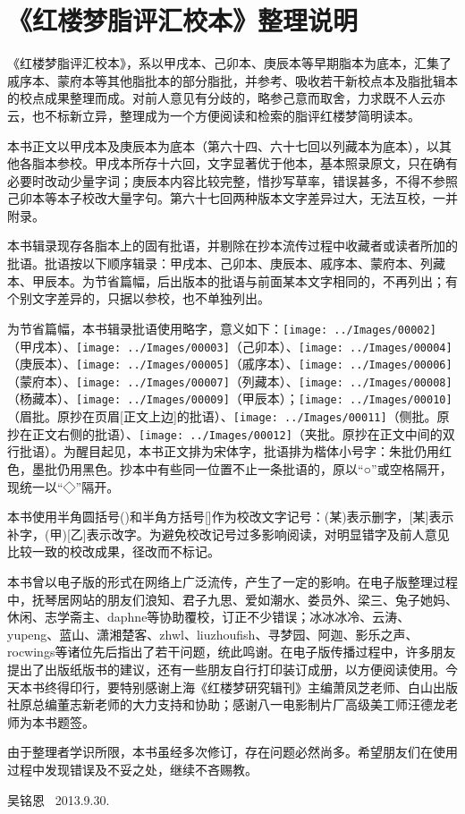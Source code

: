 
\chapter{《红楼梦脂评汇校本》整理说明}

《红楼梦脂评汇校本》，系以甲戌本、己卯本、庚辰本等早期脂本为底本，汇集了戚序本、蒙府本等其他脂批本的部分脂批，并参考、吸收若干新校点本及脂批辑本的校点成果整理而成。对前人意见有分歧的，略参己意而取舍，力求既不人云亦云，也不标新立异，整理成为一个方便阅读和检索的脂评红楼梦简明读本。

本书正文以甲戌本及庚辰本为底本（第六十四、六十七回以列藏本为底本），以其他各脂本参校。甲戌本所存十六回，文字显著优于他本，基本照录原文，只在确有必要时改动少量字词；庚辰本内容比较完整，惜抄写草率，错误甚多，不得不参照己卯本等本子校改大量字句。第六十七回两种版本文字差异过大，无法互校，一并附录。

本书辑录现存各脂本上的固有批语，并剔除在抄本流传过程中收藏者或读者所加的批语。批语按以下顺序辑录：甲戌本、己卯本、庚辰本、戚序本、蒙府本、列藏本、甲辰本。为节省篇幅，后出版本的批语与前面某本文字相同的，不再列出；有个别文字差异的，只据以参校，也不单独列出。

为节省篇幅，本书辑录批语使用略字，意义如下：\texttt{[image: ../Images/00002]}（甲戌本）、\texttt{[image: ../Images/00003]}（己卯本）、\texttt{[image: ../Images/00004]}（庚辰本）、\texttt{[image: ../Images/00005]}（戚序本）、\texttt{[image: ../Images/00006]}（蒙府本）、\texttt{[image: ../Images/00007]}（列藏本）、\texttt{[image: ../Images/00008]}（杨藏本）、\texttt{[image: ../Images/00009]}（甲辰本）；\texttt{[image: ../Images/00010]}\footnotesize  （眉批。原抄在页眉{[}正文上边{]}的批语）、\texttt{[image: ../Images/00011]}\footnotesize （侧批。原抄在正文右侧的批语）、\texttt{[image: ../Images/00012]}\footnotesize （夹批。原抄在正文中间的双行批语）。为醒目起见，本书正文排为宋体字，批语排为楷体小号字：朱批仍用红色，墨批仍用黑色。抄本中有些同一位置不止一条批语的，原以``○''或空格隔开，现统一以``◇''隔开。

本书使用半角圆括号()和半角方括号{[}{]}作为校改文字记号：(某)表示删字，{[}某{]}表示补字，(甲){[}乙{]}表示改字。为避免校改记号过多影响阅读，对明显错字及前人意见比较一致的校改成果，径改而不标记。

本书曾以电子版的形式在网络上广泛流传，产生了一定的影响。在电子版整理过程中，抚琴居网站的朋友们浪知、君子九思、爱如潮水、娄员外、梁三、兔子她妈、休闲、志学斋主、daphne等协助覆校，订正不少错误；冰冰冰冷、云涛、yupeng、蓝山、潇湘楚客、zhwl、liuzhoufish、寻梦园、阿迦、影乐之声、rocwings等诸位先后指出了若干问题，统此鸣谢。在电子版传播过程中，许多朋友提出了出版纸版书的建议，还有一些朋友自行打印装订成册，以方便阅读使用。今天本书终得印行，要特别感谢上海《红楼梦研究辑刊》主编萧凤芝老师、白山出版社原总编董志新老师的大力支持和协助；感谢八一电影制片厂高级美工师汪德龙老师为本书题签。

由于整理者学识所限，本书虽经多次修订，存在问题必然尚多。希望朋友们在使用过程中发现错误及不妥之处，继续不吝赐教。

吴铭恩 ~2013.9.30.~~~~
